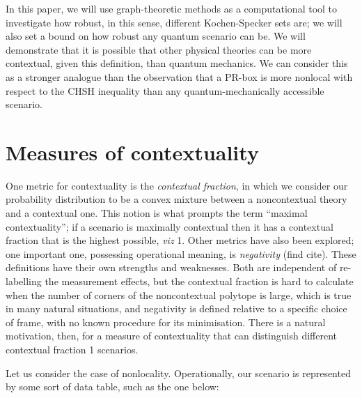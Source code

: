 \documentclass{amsart}
\theoremstyle{definition}
\begin{document}
In this paper, we will use graph-theoretic methods as a computational tool to investigate how robust, in this sense, different Kochen-Specker sets are; we will also set a bound on how robust any quantum scenario can be. We will demonstrate that it is possible that other physical theories can be more contextual, given this definition, than quantum mechanics. We can consider this as a stronger analogue than the observation that a PR-box is more nonlocal with respect to the CHSH inequality than any quantum-mechanically accessible scenario.



\section{Measures of contextuality}

One metric for contextuality is the \emph{contextual fraction},\cite{Abra2017} in which we consider our probability distribution to be a convex mixture between a noncontextual theory and a contextual one. This notion is what prompts the term ``maximal contextuality''; if a scenario is maximally contextual then it has a contextual fraction that is the highest possible, \emph{viz} 1. Other metrics have also been explored; one important one, possessing operational meaning, is \emph{negativity} (find cite). These definitions have their own strengths and weaknesses. Both are independent of re-labelling the measurement effects, but the contextual fraction is hard to calculate when the number of corners of the noncontextual polytope is large, which is true in many natural situations, and negativity is defined relative to a specific choice of frame, with no known procedure for its minimisation. There is a natural motivation, then, for a measure of contextuality that can distinguish different contextual fraction 1 scenarios.

Let us consider the case of nonlocality. Operationally, our scenario is represented by some sort of data table, such as the one below:
\end{document}
